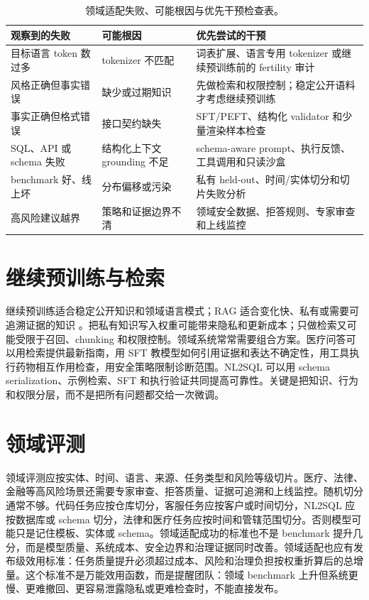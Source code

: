 \documentclass[UTF8,zihao=-4,openany]{ctexbook}
\begin{document}
\begin{table}[t]
\centering
\small
\setlength{\tabcolsep}{3pt}
\begin{tabular}{@{}p{}p{}p{}@{}}
\toprule
观察到的失败 & 可能根因 & 优先尝试的干预 \\
\midrule
目标语言 token 数过多 & tokenizer 不匹配 & 词表扩展、语言专用 tokenizer 或继续预训练前的 fertility 审计 \\
风格正确但事实错误 & 缺少或过期知识 & 先做检索和权限控制；稳定公开语料才考虑继续预训练 \\
事实正确但格式错误 & 接口契约缺失 & SFT/PEFT、结构化 validator 和少量渲染样本检查 \\
SQL、API 或 schema 失败 & 结构化上下文 grounding 不足 & schema-aware prompt、执行反馈、工具调用和只读沙盒 \\
benchmark 好、线上坏 & 分布偏移或污染 & 私有 held-out、时间/实体切分和切片失败分析 \\
高风险建议越界 & 策略和证据边界不清 & 领域安全数据、拒答规则、专家审查和上线监控 \\
\bottomrule
\end{tabular}
\caption{领域适配失败、可能根因与优先干预检查表。}
\label{tab:zh-domain-adaptation-diagnosis}
\end{table}

\section{继续预训练与检索}
继续预训练适合稳定公开知识和领域语言模式；RAG 适合变化快、私有或需要可追溯证据的知识 \cite{gururangan2020dont,lewis2020retrieval}。把私有知识写入权重可能带来隐私和更新成本；只做检索又可能受限于召回、chunking 和权限控制。领域系统常常需要组合方案。医疗问答可以用检索提供最新指南，用 SFT 教模型如何引用证据和表达不确定性，用工具执行药物相互作用检查，用安全策略限制诊断范围。NL2SQL 可以用 schema serialization、示例检索、SFT 和执行验证共同提高可靠性。关键是把知识、行为和权限分层，而不是把所有问题都交给一次微调。

\section{领域评测}
领域评测应按实体、时间、语言、来源、任务类型和风险等级切片。医疗、法律、金融等高风险场景还需要专家审查、拒答质量、证据可追溯和上线监控。随机切分通常不够。代码任务应按仓库切分，客服任务应按客户或时间切分，NL2SQL 应按数据库或 schema 切分，法律和医疗任务应按时间和管辖范围切分。否则模型可能只是记住模板、实体或 schema。领域适配成功的标准也不是 benchmark 提升几分，而是模型质量、系统成本、安全边界和治理证据同时改善。领域适配也应有发布级效用标准：任务质量提升必须超过成本、风险和治理负担按权重折算后的总增量。这个标准不是万能效用函数，而是提醒团队：领域 benchmark 上升但系统更慢、更难撤回、更容易泄露隐私或更难检查时，不能直接发布。
\end{document}
